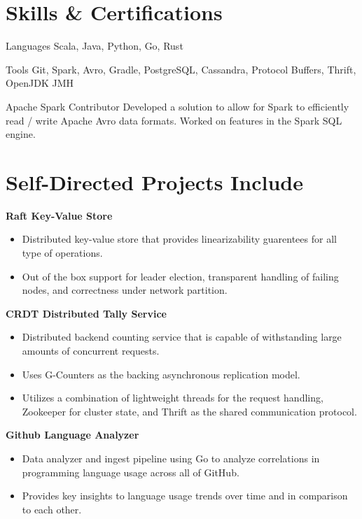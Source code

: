 \documentclass[a4paper,margin,line]{resume}
\begin{document}
\begin{resume}
\section{\mysidestyle Skills \& Certifications}
  \begin{compactdesc}
  \item[Languages] \small Scala, Java, Python, Go, Rust
  \item[Tools] \small Git, Spark, Avro, Gradle, PostgreSQL, Cassandra, Protocol Buffers, Thrift,
    OpenJDK JMH
  \item[Apache Spark Contributor] Developed a solution to allow for Spark to efficiently read /
    write Apache Avro data formats. Worked on features in the Spark SQL engine.
  \end{compactdesc}
  \vspace{-2mm}
  \section{\mysidestyle Self-Directed Projects Include}
  \textbf{Raft Key-Value Store}
  \begin{itemize}
    \item Distributed key-value store that provides linearizability guarentees for all type of
      operations.
    \item Out of the box support for leader election, transparent handling of failing nodes, and
      correctness under network partition.
  \end{itemize}
  \vspace{-2mm}
  \textbf{CRDT Distributed Tally Service}
  \begin{itemize}
    \item Distributed backend counting service that is capable of withstanding large amounts of
      concurrent requests.
    \item Uses G-Counters as the backing asynchronous replication model.
    \item Utilizes a combination of lightweight threads for the request handling, Zookeeper for
      cluster state, and Thrift as the shared communication protocol.
  \end{itemize}
  \vspace{-2mm}
  \textbf{Github Language Analyzer}
  \begin{itemize}
    \item Data analyzer and ingest pipeline using Go to analyze correlations in programming language
      usage across all of GitHub.
    \item Provides key insights to language usage trends over time and in comparison to each other.
  \end{itemize}
\end{resume}
\end{document}
